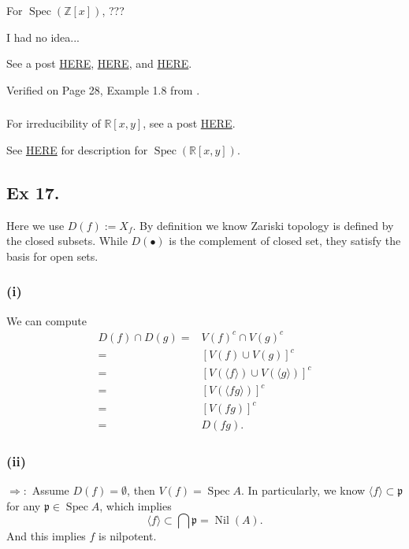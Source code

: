 For $\operatorname{Spec}(\mathbb Z[x])$, ???

I had no idea... 

See a post \href{https://math.stackexchange.com/questions/4088566/most-even-degree-polynomials-in-mathbbrx-are-reducible}{HERE}, \href{https://math.stackexchange.com/questions/1089479/a-question-on-mumfords-drawing-of-textspec-mathbbzx}{HERE}, and \href{URLhttps://math.stackexchange.com/questions/174595/classification-of-prime-ideals-of-mathbbzx}{HERE}. 

Verified on Page 28, Example 1.8 from \cite{QingLiu2002algebraic}. 

\subsubsection{}

For irreducibility of $\mathbb R[x,y]$, see a post \href{https://math.stackexchange.com/questions/125146/irreducibility-of-a-polynomial-in-the-ring-mathbbrx-y}{HERE}.

See \href{https://math.stackexchange.com/questions/1281142/what-are-the-closed-points-of-mathbba-mathbbr2-operatornamespec}{HERE} for description for $\operatorname{Spec}(\mathbb R[x,y])$. 



\subsection{Ex 17.}\label{Atiyah Chapter 1 Ex 17.}
Here we use $D(f):=X_{f}$.
By definition we know Zariski topology is defined by the closed subsets. While $D(\bullet)$ is the complement of closed set, they satisfy the basis for open sets. 
\subsubsection{(i)}
We can compute \begin{align*}
    D(f)\cap D(g) =& V(f)^c \cap V(g)^c\\
    =& [V(f)\cup V(g)]^c\\
    =& [V(\langle f\rangle)\cup V(\langle g\rangle)]^c\\
    =& [V(\langle fg\rangle)]^c\\
    =& [V(fg)]^c\\
    =& D(fg).
\end{align*}
\subsubsection{(ii)}
$\Rightarrow:$ Assume $D(f)=\emptyset$, then $V(f)=\operatorname{Spec}A$. In particularly, we know $\langle f\rangle\subset \mathfrak p$ for any $\mathfrak p\in \operatorname{Spec}A$, which implies 
$$\langle f\rangle \subset \bigcap \mathfrak p=\operatorname{Nil}(A).$$ And this implies $f$ is nilpotent.


